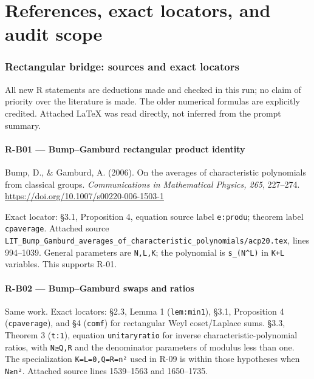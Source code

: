 \documentclass[11pt,a4paper]{article}
\theoremstyle{definition}\newtheorem{definition}{Definition}
\begin{document}
\appendix
\part{References, exact locators, and audit scope}
\section{Rectangular bridge: sources and exact
locators}\label{rectangular-bridge-sources-and-exact-locators}

All new R statements are deductions made and checked in this run; no
claim of priority over the literature is made. The older numerical
formulas are explicitly credited. Attached LaTeX was read directly, not
inferred from the prompt summary.

\subsection{R-B01 --- Bump--Gamburd rectangular product
identity}\label{r-b01--bumpgamburd-rectangular-product-identity}

Bump, D., \& Gamburd, A. (2006). On the averages of characteristic
polynomials from classical groups. \emph{Communications in Mathematical
Physics, 265}, 227--274. \url{https://doi.org/10.1007/s00220-006-1503-1}

Exact locator: §3.1, Proposition 4, equation source label
\texttt{e:produ}; theorem label \texttt{cpaverage}. Attached source
\texttt{LIT\_Bump\_Gamburd\_averages\_of\_characteristic\_polynomials/acp20.tex},
lines 994--1039. General parameters are \texttt{N,L,K}; the polynomial
is \texttt{s\_(N\^{}L)} in \texttt{K+L} variables. This supports R-01.

\subsection{R-B02 --- Bump--Gamburd swaps and
ratios}\label{r-b02--bumpgamburd-swaps-and-ratios}

Same work. Exact locators: §2.3, Lemma 1 (\texttt{lem:min1}), §3.1,
Proposition 4 (\texttt{cpaverage}), and §4 (\texttt{comf}) for
rectangular Weyl coset/Laplace sums. §3.3, Theorem 3 (\texttt{t:1}),
equation \texttt{unitaryratio} for inverse characteristic-polynomial
ratios, with \texttt{N≥Q,R} and the denominator parameters of modulus
less than one. The specialization \texttt{K=L=0,Q=R=n²} used in R-09 is
within those hypotheses when \texttt{N≥n²}. Attached source lines
1539--1563 and 1650--1735.
\end{document}
